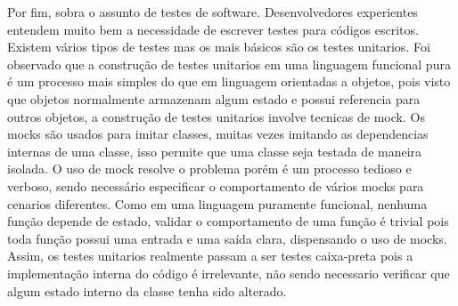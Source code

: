 Por fim, sobra o assunto de testes de software.
Desenvolvedores experientes entendem muito bem a necessidade de escrever testes para códigos escritos.
Existem vários tipos de testes mas os mais básicos são os testes unitarios.
Foi observado que a construção de testes unitarios em uma linguagem funcional pura é um processo mais simples do que em linguagem orientadas a objetos, pois visto que objetos normalmente armazenam algum estado e possui referencia para outros objetos, a construção de testes unitarios involve tecnicas de mock.
Os mocks são usados para imitar classes, muitas vezes imitando as dependencias internas de uma classe, isso permite que uma classe seja testada de maneira isolada.
O uso de mock resolve o problema porém é um processo tedioso e verboso, sendo necessário especificar o comportamento de vários mocks para cenarios diferentes.
Como em uma linguagem puramente funcional, nenhuma função depende de estado, validar o comportamento de uma função é trivial pois toda função possui uma entrada e uma saída clara, dispensando o uso de mocks.
Assim, os testes unitarios realmente passam a ser testes caixa-preta pois a implementação interna do código é irrelevante, não sendo necessario verificar que algum estado interno da classe tenha sido alterado.

